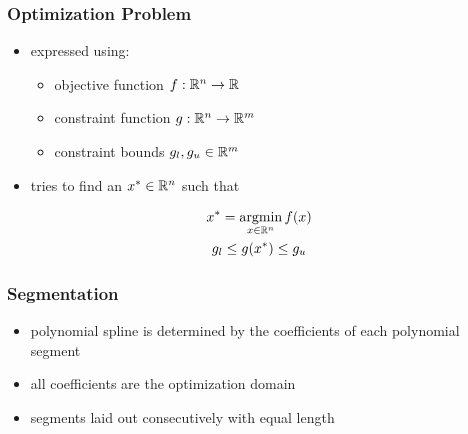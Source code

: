 \documentclass{beamer}
\begin{document}
		\begin{frame}
			\frametitle{Optimization Problem}
			\begin{itemize}
				\item expressed using:
				\begin{itemize}
					\item objective function \(f : \mathbb{R}^{n} \rightarrow \mathbb{R}\)
					\item constraint function \(g : \mathbb{R}^{n} \rightarrow \mathbb{R}^{m}\)
					\item constraint bounds \(g_l, g_u \in \mathbb{R}^{m}\)
				\end{itemize} 
				\item tries to find an \(x^* \in \mathbb{R}^{n}\) such that 
			\end{itemize}
			\begin{equation*}
				\begin{gathered}
					x^* = \operatorname*{argmin}_{x \in \mathbb{R}^{n}} f\!\left( x \right)\\
					g_l \leq g\!\left( x^* \right) \leq g_u
				\end{gathered}
			\end{equation*}
		\end{frame}
		
		
		\begin{frame}
			\frametitle{Segmentation}
			\begin{itemize}
				\item polynomial spline is determined by the coefficients of each polynomial segment
				\item all coefficients are the optimization domain
				\item segments laid out consecutively with equal length
			\end{itemize}
		\end{frame}
\end{document}
